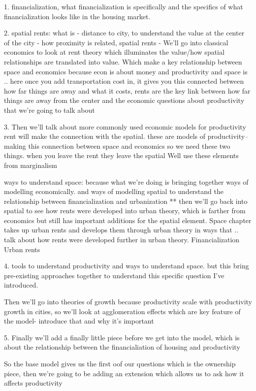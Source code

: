 1. financialization, what financialization is  specifically  and  the specifics of what financialization looks like in the housing market.

2. spatial rents: what is - distance to city, to understand the value at the center of the city - how proximity is related, spatial rents - We'll go into classical economics to look at rent theory which illuminates the value/how spatial relationships are translated into value. Which make a key relationship between space and economics because econ is about money and productivity and space is .. here once you add transportation cost in, it gives you this connected between how far things are away and what it costs, rents are the key link between how far things are away from the center and the economic questions about productivity  that we're going to talk about

3. Then we'll talk about more commonly used economic models for productivity
rent will make the connection with the spatial. 
these are models of productivity-- making this connection between space and economics so we need these two things.
when you leave the rent they leave the spatial
Well use these elements from marginalism

 ways to understand space: because what we’re doing is bringing together ways of modelling economically. and ways of modelling spatial to understand the relationship between financialization and urbanization **
then we'll go back into spatial to see how rents were developed into urban theory, which is farther from economics but still has important additions for the spatial element. 
Space chapter takes up urban rents and develops them through urban theory in ways that .. talk about how rents were developed further in urban theory.
Financialization
Urban rents

4. tools to understand productivity and ways to understand space. but this bring pre-existing approaches together to understand this specific question I've introduced.


Then we'll go into theories of growth because productivity scale with productivity growth in cities, so we'll look at agglomeration effects which are key feature of the model- introduce that and why it's important

5. Finally  we'll add a finally little piece before we get  into the model,  which is about the relationship between the financialiation of housing and productivity

So the base model gives us the first oof our questions which is the ownership piece, then we're going to be adding an extension which allows us to ask how it affects productivity

